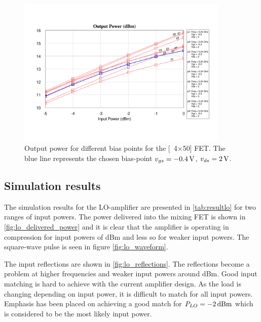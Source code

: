 			\begin{figure}[hbt!]
				\centering
				\includegraphics[trim=50 60 30 60, clip, width=0.9\textwidth]{fig/amplifiers/lo/4x50_output_power}
				\caption[Gain for different bias-points]{Output power for different bias points for the \unit[4$\times$50]{\mum} FET. The blue line represents the chosen bias-point $v_{gs}=\unit[-0.4]{V}$, $v_{ds}=\unit[2]{V}$.}\label{fig:4x50_output_power}
			\end{figure}



		\subsection{Simulation results}

			The simulation results for the LO-amplifier are presented in \autoref{tab:resultlo} for two ranges of input powers. The power delivered into the mixing FET is shown in \autoref{fig:lo_delivered_power} and it is clear that the amplifier is operating in compression for input powers of \unit[-2--0]{dBm} and less so for weaker input powers. The square-wave pulse is seen in figure \autoref{fig:lo_waveform}.

			The input reflections are shown in \autoref{fig:lo_reflections}. The reflections become a problem at higher frequencies and weaker input powers around \unit[-4]{dBm}. Good input matching is hard to achieve with the current amplifier design. As the load is changing depending on input power, it is difficult to match for all input powers. Emphasis has been placed on achieving a good match for $P_{LO}=\unit[-2]{dBm}$ which is considered to be the most likely input power.



